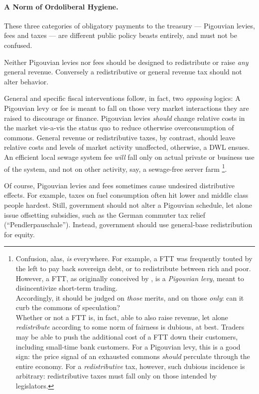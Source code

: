 \paragraph[Ordoliberal Hygiene]{A Norm of Ordoliberal Hygiene.}  \label{sec:ordoliberal_hygiene} These three categories of obligatory payments to the treasury --- Pigouvian levies, fees and taxes --- are different public policy beasts entirely, and must not be confused.

Neither Pigouvian levies nor fees should be designed to redistribute or raise \emph{any} general revenue. Conversely a redistributive or general revenue tax should not alter behavior. 

General and specific fiscal interventions follow, in fact, two \emph{opposing} logics: A Pigouvian levy or fee is meant to fall on those very market interactions they are raised to discourage or finance. Pigouvian levies \emph{should} change relative costs in the market vis-a-vis the status quo to reduce otherwise overconsumption of commons. General revenue or redistributive taxes, by contrast, should leave relative costs and levels of market activity unaffected, otherwise, a \gls{DWL} ensues. An efficient local sewage system fee \emph{will} fall only on actual private or business use of the system, and not on other activity, say, a sewage-free server farm \footnote{
	Confusion, alas, \emph{is} everywhere. For example, a \gls{FTT} was frequently touted by the left to pay back sovereign debt, or to redistribute between rich and poor. However, a \gls{FTT}, as originally conceived by \cite{Tobin1970}, is a \emph{Pigouvian levy}, meant to disincentivize short-term trading. \\ 
	Accordingly, it should be judged on \emph{those} merits, and on those \emph{only}: can it curb the commons of speculation? \\ 
	Whether or not a \gls{FTT} is, in fact, able to also raise revenue, let alone \emph{redistribute} according to some norm of fairness is dubious, at best. Traders may be able to push the additional cost of a \gls{FTT} down their customers, including small-time bank customers. For a Pigouvian levy, this is a good sign: the price signal of an exhausted commons \emph{should} perculate through the entire economy. For a \emph{redistributive} tax, however, such dubious incidence is arbitrary: redistributive taxes must fall only on those intended by legislators.}.

Of course, Pigouvian levies and fees sometimes cause undesired distributive effects. For example, taxes on fuel consumption often hit lower and middle class people hardest. Still, government should not alter a Pigouvian schedule, let alone issue offsetting subsidies, such as the German commuter tax relief (``Pendlerpauschale''). Instead, government should use general-base redistribution for equity.

